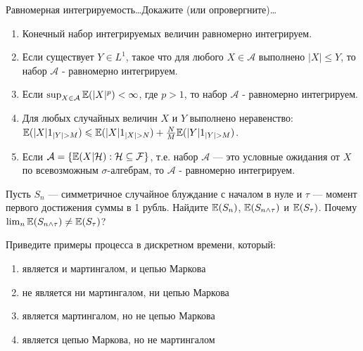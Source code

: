 \begin{problem}
Равномерная интегрируемость\ldots Докажите (или опровергните)\ldots
\begin{enumerate}
\item  Конечный набор интегрируемых величин равномерно
интегрируем.
\item Если существует $Y\in L^{1}$, такое что для любого $X\in
\mathcal{A}$ выполнено $|X|\le Y$, то набор $\mathcal{A}$ -
равномерно интегрируем.
\item Если $\sup_{X\in \mathcal{A}}\mathbb{E}(|X|^{p})<\infty$, где $p>1$, то
набор $\mathcal{A}$ -
равномерно интегрируем.
\item Для любых случайных величин $X$ и $Y$ выполнено неравенство:
$\E(|X|1_{|Y|>M})\le \E(|X|1_{|X|>N})+\frac{N}{M}\E(|Y|1_{|Y|>M})$.
\item Если $\mathcal{A}=\{\mathbb{E}(X|\mathcal{H}):\mathcal{H}\subseteq
\mathcal{F}\}$, т.е. набор $\mathcal{A}$ — это условные ожидания
от $X$ по всевозможным $\sigma$-алгебрам, то $\mathcal{A}$ -
равномерно интегрируем.
\end{enumerate}

\begin{sol}

\end{sol}
\end{problem}

\begin{problem}
Пусть $S_{n}$ — симметричное случайное блуждание с началом в
нуле и $\tau$ — момент первого достижения суммы в 1 рубль. Найдите
$\mathbb{E}(S_{n})$, $\mathbb{E}(S_{n\wedge \tau})$ и $\mathbb{E}(S_{\tau})$. Почему
$\lim_{n}
\mathbb{E}(S_{n\wedge \tau})\neq \mathbb{E}(S_{\tau})$?

\begin{sol}

\end{sol}
\end{problem}

\begin{problem}
Приведите примеры процесса в дискретном времени, который:
\begin{enumerate}
\item является и мартингалом, и цепью Маркова
\item не является ни мартингалом, ни цепью Маркова
\item является мартингалом, но не цепью Маркова
\item является цепью Маркова, но не мартингалом
\end{enumerate}

\begin{sol}
\end{sol}
\end{problem}

